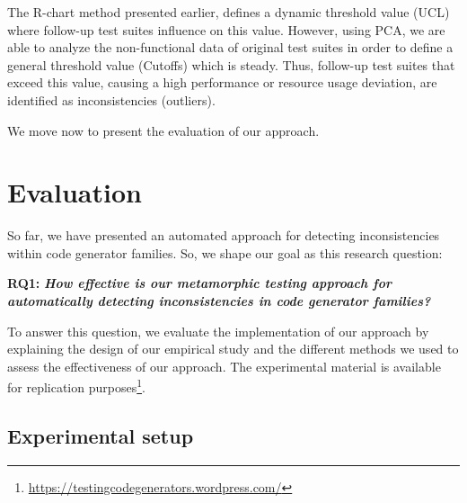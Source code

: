\begin{remark}
The R-chart method presented earlier, defines a dynamic threshold value (UCL) where follow-up test suites influence on this value. However, using PCA, we are able to analyze the non-functional data of original test suites in order to define a general threshold value (Cutoffs) which is steady. Thus, follow-up test suites that exceed this value, causing a high performance or resource usage deviation, are identified as inconsistencies (outliers).
\end{remark}

We move now to present the evaluation of our approach.


\section{Evaluation}
\label{sec:cg_evaluation}
So far, we have presented an automated approach for detecting inconsistencies within code generator families. So, we shape our goal as this research question:

\textbf{RQ1: } 
\textbf{\textit{How effective is our metamorphic testing approach for automatically detecting inconsistencies in code generator families?}} 

To answer this question, we evaluate the implementation of our approach by explaining the design of our empirical study and the different methods we used to assess the effectiveness of our approach. 
The experimental material is available for replication purposes\footnote{\url{https://testingcodegenerators.wordpress.com/}}.
\subsection{Experimental setup}
